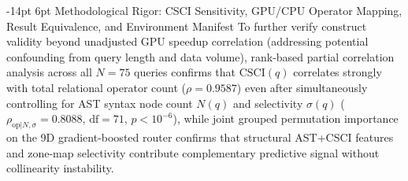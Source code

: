 \documentclass[10pt,a4paper]{article}
\makeatletter
\renewcommand\subsection{\@startsection{subsection}{2}{\z@}%
  {-14pt \@plus -3pt \@minus -1.5pt}%
  {6pt \@plus 1.5pt}%
  {\normalfont\normalsize\bfseries}}
\makeatother
\begin{document}
\subsection{Methodological Rigor: CSCI Sensitivity, GPU/CPU Operator Mapping, Result Equivalence, and Environment Manifest}
To further verify construct validity beyond unadjusted GPU speedup correlation (addressing potential confounding from query length and data volume), rank-based partial correlation analysis across all $N=75$ queries confirms that $\text{CSCI}(q)$ correlates strongly with total relational operator count ($\rho = 0.9587$) even after simultaneously controlling for AST syntax node count $N(q)$ and selectivity $\sigma(q)$ ($\rho_{\text{op}|N,\sigma} = 0.8088$, $\text{df}=71$, $p < 10^{-6}$), while joint grouped permutation importance on the 9D gradient-boosted router confirms that structural AST+CSCI features and zone-map selectivity contribute complementary predictive signal without collinearity instability.
\end{document}
